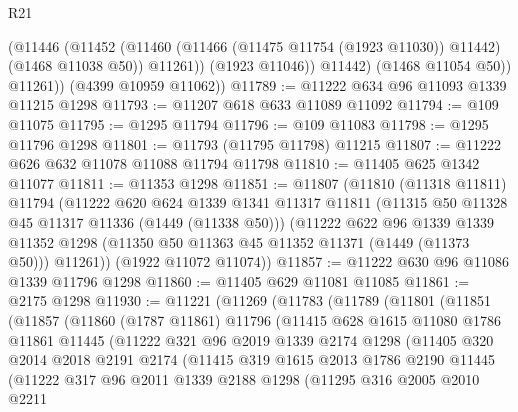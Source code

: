 \begin{lexlean}{R21}
\begin{coremodule}
                (@11446
                  (@11452
                    (@11460 (@11466 (@11475 @11754 (@1923 @11030)) @11442) (@1468 @11038 @50))
                    @11261))
                (@1923 @11046))
              @11442)
            (@1468 @11054 @50))
          @11261))
      (@4399 @10959 @11062))
@11789 := @11222 @634 @96 @11093 @1339 @11215 @1298
@11793 := @11207 @618 @633 @11089 @11092
@11794 := @109 @11075
@11795 := @1295 @11794
@11796 := @109 @11083
@11798 := @1295 @11796 @1298
@11801 := @11793 (@11795 @11798) @11215
@11807 := @11222 @626 @632 @11078 @11088 @11794 @11798
@11810 := @11405 @625 @1342 @11077
@11811 := @11353 @1298
@11851 := @11807
    (@11810
      (@11318 @11811)
      @11794
      (@11222
        @620
        @624
        @1339
        @1341
        @11317
        @11811
        (@11315 @50 @11328 @45 @11317 @11336 (@1449 (@11338 @50)))
        (@11222
          @622
          @96
          @1339
          @1339
          @11352
          @1298
          (@11350 @50 @11363 @45 @11352 @11371 (@1449 (@11373 @50)))
          @11261))
      (@1922 @11072 @11074))
@11857 := @11222 @630 @96 @11086 @1339 @11796 @1298
@11860 := @11405 @629 @11081 @11085
@11861 := @2175 @1298
@11930 := @11221
    (@11269
      (@11783
        (@11789
          (@11801
            (@11851
              (@11857
                (@11860
                  (@1787 @11861)
                  @11796
                  (@11415
                    @628
                    @1615
                    @11080
                    @1786
                    @11861
                    @11445
                    (@11222
                      @321
                      @96
                      @2019
                      @1339
                      @2174
                      @1298
                      (@11405
                        @320
                        @2014
                        @2018
                        @2191
                        @2174
                        (@11415
                          @319
                          @1615
                          @2013
                          @1786
                          @2190
                          @11445
                          (@11222
                            @317
                            @96
                            @2011
                            @1339
                            @2188
                            @1298
                            (@11295
                              @316
                              @2005
                              @2010
                              @2211

\end{coremodule}
\end{lexlean}
